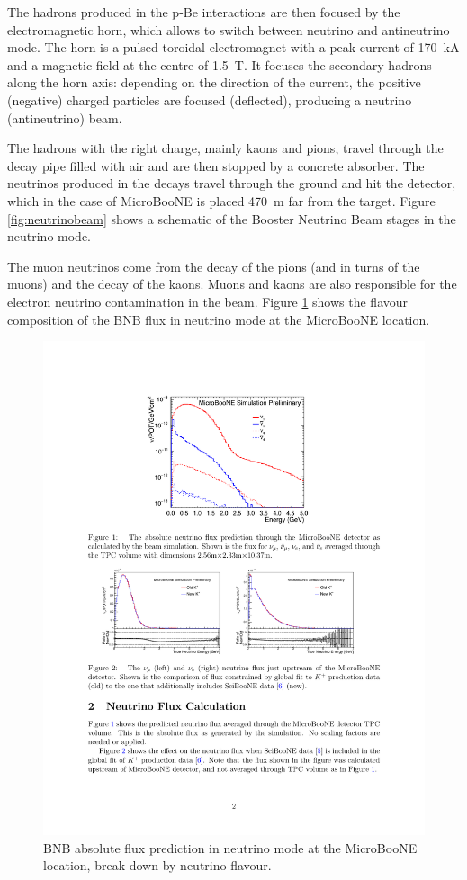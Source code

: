 The hadrons produced in the p-Be interactions are then focused by the electromagnetic horn, which allows to switch between neutrino and antineutrino mode. The horn is a pulsed toroidal electromagnet with a peak current of 170~kA and a magnetic field at the centre of 1.5~T. It  focuses the secondary hadrons along the horn axis: depending on the direction of the current, the positive (negative) charged particles are focused (deflected), producing a neutrino (antineutrino) beam. 

The hadrons with the right charge, mainly kaons and pions, travel through the decay pipe filled with air and are then stopped by a concrete absorber. The neutrinos produced in the decays travel through the ground and hit the detector, which in the case of MicroBooNE is placed 470~m far from the target. Figure \ref{fig:neutrinobeam} shows a schematic of the Booster Neutrino Beam stages in the neutrino mode. 

The muon neutrinos come from the decay of the pions (and in turns of the muons) and the decay of the kaons. Muons and kaons are also responsible for the electron neutrino contamination in the beam. Figure \ref{fig:bnbflux} shows the flavour composition of the BNB flux in neutrino mode at the MicroBooNE location.

\begin{figure}[htbp]
    \centering
    \includegraphics[width=0.7\linewidth]{figures/bnbflux.pdf}
    \caption{BNB absolute flux prediction in neutrino mode at the MicroBooNE location, break down by neutrino flavour.}
    \label{fig:bnbflux}
\end{figure}


